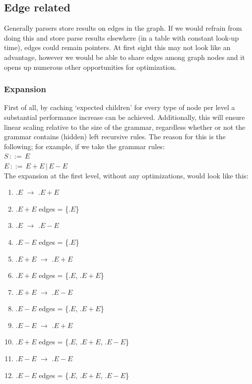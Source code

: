 \documentclass[a4paper,10pt]{article}
\begin{document}
\subsection{Edge related}
\label{sec:edgeOptimizations}

Generally parsers store results on edges in the graph. If we would refrain from doing this and store parse results elsewhere (in a table with constant look-up time), edges could remain pointers. At first sight this may not look like an advantage, however we would be able to share edges among graph nodes and it opens up numerous other opportunities for optimization.

\subsubsection{Expansion}
\label{subsec:nodeExpansionOptimization}
First of all, by caching `expected children' for every type of node per level a substantial performance increase can be achieved. Additionally, this will ensure linear scaling relative to the size of the grammar, regardless whether or not the grammar contains (hidden) left recursive rules. The reason for this is the following; for example, if we take the grammar rules:\\
$S\,::=\,E$\\
$E\,::=\,E + E\,|\,E - E$\\
The expansion at the first level, without any optimizations, would look like this:
\begin{enumerate}
 \setlength{\itemsep}{0pt}
 \setlength{\parskip}{0pt}
 \setlength{\parsep}{0pt}
 
 \item $.E$ $\rightarrow$ $.E+E$
 \item $.E+E$ edges = \{$.E$\}
 \item $.E$ $\rightarrow$ $.E-E$
 \item $.E-E$ edges = \{$.E$\}
 \item $.E+E$ $\rightarrow$ $.E+E$
 \item $.E+E$ edges = \{$.E$, $.E+E$\}
 \item $.E+E$ $\rightarrow$ $.E-E$
 \item $.E-E$ edges = \{$.E$, $.E+E$\}
 \item $.E-E$ $\rightarrow$ $.E+E$
 \item $.E+E$ edges = \{$.E$, $.E+E$, $.E-E$\}
 \item $.E-E$ $\rightarrow$ $.E-E$
 \item $.E-E$ edges = \{$.E$, $.E+E$, $.E-E$\}
\end{enumerate}
\end{document}
